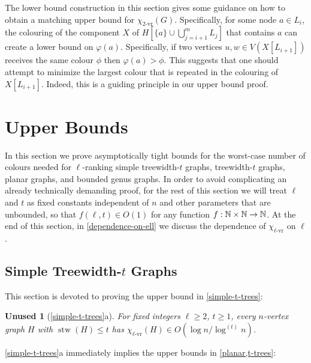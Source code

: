 \documentclass[kpfonts]{patmorin}
\DeclareMathOperator{\stw}{stw}
\newcommand{\rn}[1]{\chi_{\operatorname{#1-vr}}}
\newcommand{\trn}{\rn{2}}
\newcommand{\lrn}{\rn{\ell}}
\theoremstyle{named}
\newtheorem*{namedtheorem}{Unused}
\newcommand{\weirdref}[2]{\cref{#1}#2}
\newcommand{\weirdlabel}[2]{\label{#1-#1}}
\begin{document}
The lower bound construction in this section gives some guidance on how to obtain a matching upper bound for $\trn(G)$.  Specifically, for some node $a\in L_i$, the colouring of the component $X$ of $H[\{a\}\cup\bigcup_{j=i+1}^m L_j]$ that contains $a$ can create a lower bound on $\varphi(a)$.  Specifically, if two vertices $u,w\in V(X[L_{i+1}])$ receives the same colour $\phi$ then $\varphi(a)>\phi$.  This suggests that one should attempt to minimize the largest colour that is repeated in the colouring of $X[L_{i+1}]$.  Indeed, this is a guiding principle in our upper bound proof.


\section{Upper Bounds}
\label{upper-bounds}

In this section we prove asymptotically tight bounds for the worst-case number of colours needed for $\ell$-ranking simple treewidth-$t$ graphs, treewidth-$t$ graphs, planar graphs, and bounded genus graphs. In order to avoid complicating an already technically demanding proof, for the rest of this section we will treat $\ell$ and $t$ as fixed constants independent of $n$ and other parameters that are unbounded, so that $f(\ell,t)\in O(1)$ for any function $f:\mathbb{N}\times\mathbb{N}\to\mathbb{N}$.  At the end of this section, in \cref{dependence-on-ell} we discuss the dependence of $\lrn$ on $\ell$.


\subsection{Simple Treewidth-$t$ Graphs}
\label{simple-treewidth-section}

This section is devoted to proving the upper bound in \cref{simple-t-trees}:

\begin{namedtheorem}[\weirdref{simple-t-trees}{a}]\weirdlabel{simple-t-trees}{a}
    For fixed integers $\ell\ge 2$, $t\ge 1$, every $n$-vertex graph $H$ with $\stw(H)\le t$ has $\lrn(H)\in O(\log n/\log^{(t)} n)$.
\end{namedtheorem}

\weirdref{simple-t-trees}{a} immediately implies the upper bounds in \cref{planar,t-trees}:
\end{document}
